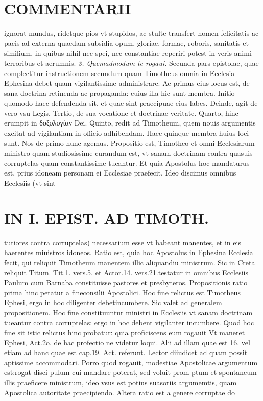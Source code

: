 \documentclass{article}
\begin{document}
\begin{pages}
\section*{COMMENTARII }
\marginpar{[ p.16 ]}\pstart ignorat mundus, ridetque pios vt stupidos, ac stulte transfert nomen felicitatis ac pacis ad externa quaedam subsidia opum, gloriae, formae, roboris, sanitatis et similium, in quibus nihil nec spei, nec constantiae reperiri potest in veris animi terroribus et aerumnis.  \pend
\textit{3. Quemadmodum te rogaui. }\pstart Secunda pars epistolae, quae complectitur instructionem secundum quam Timotheus omnia in Ecclesia Ephesina debet quam vigilantissime administrare.  \pend\pstart Ac primus eius locus est, de sana doctrina retinenda ac propaganda: cuius illa hic sunt membra. Initio quomodo haec defendenda sit, et quae sint praecipuae eius labes. Deinde, agit de vero vsu Legis. Tertio, de sua vocatione et doctrinae veritate. Quarto, hinc erumpit in δοξολογίαν Dei. Quinto, redit ad Timotheum, quem nouis argumentis excitat ad vigilantiam in officio adhibendam. Haec quinque membra huius loci sunt. Nos de primo nunc agemus.  \pend\pstart Propositio est, Timotheo et omni Ecclesiarum ministro quam studiosissime curandum est, vt sanam doctrinam contra quasuis corruptelas quam constantissime tueantur. Et quia Apostolus hoc mandaturus est, prius idoneam personam ei Ecclesiae praefecit. Ideo discimus omnibus Ecclesiis (vt sint  \pend
\section*{IN I. EPIST. AD TIMOTH. }
\marginpar{[ p.17 ]}\pstart tutiores contra corruptelas) necessarium esse vt habeant manentes, et in eis haerentes miuistros idoneos. Ratio est, quia hoc Apostolus in Ephesina Ecclesia fecit, qui reliquit Timotheum manentem illic aliquandiu ministrum. Sic in Creta reliquit Titum. Tit.1. vers.5. et Actor.14. vers.21.testatur in omnibus Ecclesiis Paulum cum Barnaba constituisse pastores et presbyteros.  \pend\pstart Propositionis ratio prima hinc petatur a fineconsilii Apostolici. Hoc fine relictus est Timotheus Ephesi, ergo in hoc diligenter debetincumbere. Sic valet ad generalem propositionem. Hoc fine constituuntur ministri in Ecclesiis vt sanam doctrinam tueantur contra corruptelas: ergo in hoc debent vigilanter incumbere. Quod hoc fine sit istic relictus hinc probatur: quia proficiscens eum rogauit Vt maneret Ephesi, Act.2o. de hac profectio ne videtur loqui. Alii ad illam quae est 16. vel etiam ad hanc quae est cap.19. Act. referunt. Lector diiudicet ad quam possit aptissime accommodari. Porro quod rogauit, modestiae Apostolicae argumentum est:rogat disci pulum cui mandare poterat, sed voluit prom ptum et spontaneum illis praeficere ministrum, ideo vsus est potius suasoriis argumemtis, quam Apostolica autoritate praecipiendo. Altera ratio est a genere corruptae do\pend

\end{pages}
\end{document}
